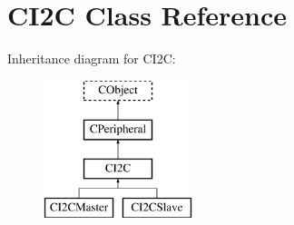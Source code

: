 \hypertarget{class_c_i2_c}{\section{C\-I2\-C Class Reference}
\label{class_c_i2_c}
}
Inheritance diagram for C\-I2\-C\-:\begin{figure}[H]
\begin{center}
\leavevmode
\includegraphics[height=4.000000cm]{class_c_i2_c}
\end{center}
\end{figure}
